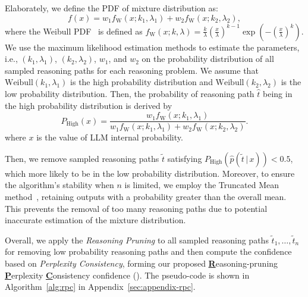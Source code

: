 Elaborately, we define the PDF of mixture distribution as: 
\begin{equation*} \label{eq:weibull-mix}
    f(x) = w_1 f_{\text{W}}(x; k_1, \lambda_1) + w_2 f_{\text{W}}(x; k_2, \lambda_2), 
\end{equation*}
where the Weibull PDF~\citep{weibull1951statistical} is defined as $f_{\text{W}}(x; k, \lambda) = \frac{k}{\lambda}\left ( \frac{x}{\lambda}\right ) ^{k-1} \exp{\left ( -(\frac{x}{\lambda})^k\right )}$.
We use the maximum likelihood estimation methods to estimate the parameters, i.e., $(k_1, \lambda_1)$, $(k_2, \lambda_2)$, $w_1$, and $w_2$ on the probability distribution of all sampled reasoning paths for each reasoning problem. 
We assume that $\text{Weibull}(k_1, \lambda_1)$ is the high probability distribution and $\text{Weibull}(k_2, \lambda_2)$ is the low probability distribution. Then, the probability of reasoning path $\hat{t}$ being in the high probability distribution is derived by 
\begin{equation*}
    P_{\text{High}}(x) = \frac{w_1 f_{\text{W}}(x; k_1, \lambda_1)}{w_1 f_{\text{W}}(x; k_1, \lambda_1) + w_2 f_{\text{W}}(x; k_2, \lambda_2)}. 
    \label{eq:weibull-prob}
\end{equation*}
where $x$ is the value of LLM internal probability. 

Then, we remove sampled reasoning paths $\tilde{t}$ satisfying $P_{\text{High}}(\hat{p}(\tilde{t}\,|\,x)) < 0.5$, which more likely to be in the low probability distribution. Moreover, to ensure the algorithm's stability when $n$ is limited, we employ the Truncated Mean method~\citep{marazzi1999truncated}, retaining outputs with a probability greater than the overall mean. This prevents the removal of too many reasoning paths due to potential inaccurate estimation of the mixture distribution. 

Overall, we apply the \emph{Reasoning Pruning} to all sampled reasoning paths $\tilde{t}_1, \dots, \tilde{t}_n$ for removing low probability reasoning paths and then compute the confidence based on \emph{Perplexity Consistency}, forming our proposed \underline{\textbf{R}}easoning-pruning \underline{\textbf{P}}erplexity \underline{\textbf{C}}onsistency confidence (\RPC). The pseudo-code is shown in Algorithm~\ref{alg:rpc} in Appendix~\ref{sec:appendix-rpc}.

